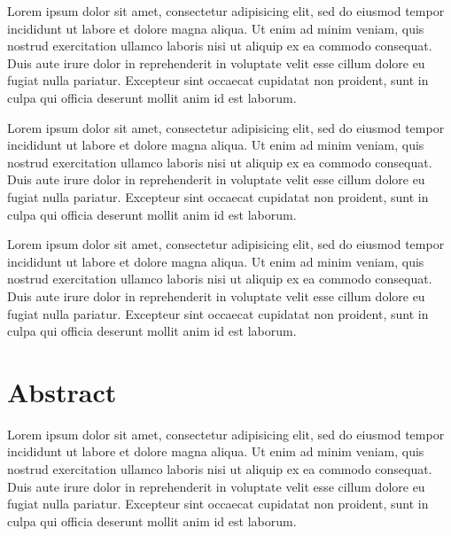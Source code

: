 \documentclass[12pt,letterpaper,oneside,final]{memoir}
\begin{document}
Lorem ipsum dolor sit amet, consectetur adipisicing elit, sed do eiusmod tempor incididunt ut labore et dolore magna aliqua. Ut enim ad minim veniam, quis nostrud exercitation ullamco laboris nisi ut aliquip ex ea commodo consequat. Duis aute irure dolor in reprehenderit in voluptate velit esse cillum dolore eu fugiat nulla pariatur. Excepteur sint occaecat cupidatat non proident, sunt in culpa qui officia deserunt mollit anim id est laborum.

Lorem ipsum dolor sit amet, consectetur adipisicing elit, sed do eiusmod tempor incididunt ut labore et dolore magna aliqua. Ut enim ad minim veniam, quis nostrud exercitation ullamco laboris nisi ut aliquip ex ea commodo consequat. Duis aute irure dolor in reprehenderit in voluptate velit esse cillum dolore eu fugiat nulla pariatur. Excepteur sint occaecat cupidatat non proident, sunt in culpa qui officia deserunt mollit anim id est laborum.

Lorem ipsum dolor sit amet, consectetur adipisicing elit, sed do eiusmod tempor incididunt ut labore et dolore magna aliqua. Ut enim ad minim veniam, quis nostrud exercitation ullamco laboris nisi ut aliquip ex ea commodo consequat. Duis aute irure dolor in reprehenderit in voluptate velit esse cillum dolore eu fugiat nulla pariatur. Excepteur sint occaecat cupidatat non proident, sunt in culpa qui officia deserunt mollit anim id est laborum.

\newpage

\chapter{Abstract}
\DoubleSpacing

Lorem ipsum dolor sit amet, consectetur adipisicing elit, sed do eiusmod tempor incididunt ut labore et dolore magna aliqua. Ut enim ad minim veniam, quis nostrud exercitation ullamco laboris nisi ut aliquip ex ea commodo consequat. Duis aute irure dolor in reprehenderit in voluptate velit esse cillum dolore eu fugiat nulla pariatur. Excepteur sint occaecat cupidatat non proident, sunt in culpa qui officia deserunt mollit anim id est laborum.

\newpage
\renewcommand*{\cftappendixname}{Appendix\space}
\renewcommand*{\contentsname}{Table of contents}
\setcounter{tocdepth}{2}%
\begin{KeepFromToc}
\tableofcontents
\end{KeepFromToc}
\clearpage
\newpage
\clearpage
\end{document}
